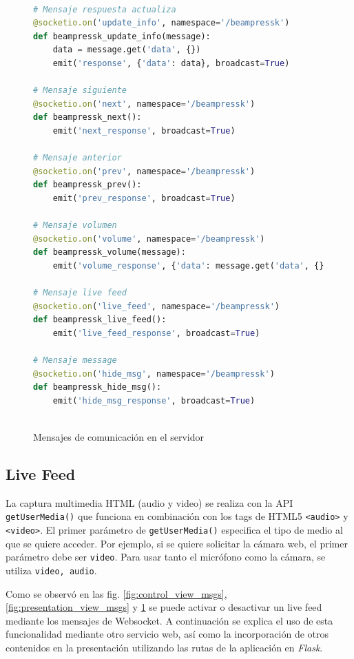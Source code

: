 			\begin{figure}[htb]%
				\begin{lstlisting}[language=Python]%

# Mensaje respuesta actualiza
@socketio.on('update_info', namespace='/beampressk')
def beampressk_update_info(message):
    data = message.get('data', {})
    emit('response', {'data': data}, broadcast=True)

# Mensaje siguiente
@socketio.on('next', namespace='/beampressk')
def beampressk_next():
    emit('next_response', broadcast=True)

# Mensaje anterior
@socketio.on('prev', namespace='/beampressk')
def beampressk_prev():
    emit('prev_response', broadcast=True)

# Mensaje volumen
@socketio.on('volume', namespace='/beampressk')
def beampressk_volume(message):
    emit('volume_response', {'data': message.get('data', {})}, broadcast=True)

# Mensaje live feed
@socketio.on('live_feed', namespace='/beampressk')
def beampressk_live_feed():
    emit('live_feed_response', broadcast=True)

# Mensaje message
@socketio.on('hide_msg', namespace='/beampressk')
def beampressk_hide_msg():
    emit('hide_msg_response', broadcast=True)
  
				\end{lstlisting}
			\caption{Mensajes de comunicación en el servidor}
			\label{fig:server_msgs}
			\end{figure}							


		\subsection{Live Feed} %
		\label{sub:live_feed}

			La captura multimedia HTML (audio y video) se realiza con la API \texttt{getUserMedia()} que funciona en combinación con los tags de HTML5 \texttt{<audio>} y \texttt{<video>}. El primer parámetro de \texttt{getUserMedia()} especifica el tipo de medio al que se quiere acceder. Por ejemplo, si se quiere solicitar la cámara web, el primer parámetro debe ser \texttt{video}. Para usar tanto el micrófono como la cámara, se utiliza \texttt{video, audio}.

			Como se observó en las fig. \ref{fig:control_view_msgs}, \ref{fig:presentation_view_msgs} y \ref{fig:server_msgs} se puede activar o desactivar un live feed mediante los mensajes de Websocket. A continuación se explica el uso de esta funcionalidad mediante otro servicio web, así como la incorporación de otros contenidos en la presentación utilizando las rutas de la aplicación en \textit{Flask}.
		
